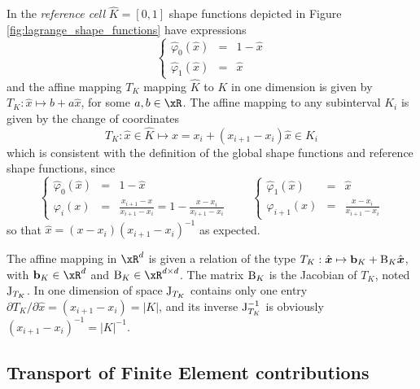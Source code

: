\medskip
In the \textit{reference cell} $\hat{K} = [0,1]$ shape functions depicted in Figure \ref{fig:lagrange_shape_functions} have expressions
\begin{equation*}
\left\lbrace
\begin{array}{lcl}
\hat\varphi_0(\hat x) &=& 1 - \hat x\\
\hat\varphi_1(\hat x) &=& \hat x
\end{array}
\right.
\end{equation*}
and the affine mapping $T_K$ mapping $\hat K$ to $K$ in one dimension is given by $T_K : \hat x \mapsto b + a \hat x$, for some $a, b\in\xR$.
The affine mapping to any subinterval $K_i$ is given by the change of coordinates
\begin{equation*}\label{eq:affine_mapping_1d}
T_K: \hat x \in \hat K \mapsto x = x_i + (x_{i+1} - x_{i}) \hat x \in K_i
\end{equation*}
which is consistent with the definition of the global shape functions and reference shape functions, since
\begin{equation*}
\left\lbrace
\begin{array}{lcl}
\hat\varphi_0(\hat x) &=& 1 - \hat x\\
\varphi_{i}(x)        &=& \displaystyle\frac{x_{i+1} - x}{x_{i+1} - x_{i}} = 1 - \frac{x - x_{i}}{x_{i+1} - x_{i}}
\end{array}
\right.
\qquad
\left\lbrace
\begin{array}{lcl}
\hat\varphi_1(\hat x) &=& \hat x\\
\varphi_{i+1}(x)      &=& \displaystyle\frac{x - x_{i}}{x_{i+1} - x_{i}}
\end{array}
\right.
\end{equation*}
so that $\hat x = (x - x_{i})(x_{i+1} - x_{i})^{-1}$ as expected.

\begin{rmrk} The affine mapping in $\xR^d$ is given a relation of the type $T_K : \hat {{{\boldsymbol x}}} \mapsto \mathbf b_K + {\mathrm B}_K \hat {{{\boldsymbol x}}}$, with $\vecb_K\in\xR^d$ and $\matB_K\in\xR^{d\times d}$.
The matrix ${\mathrm B}_K$ is the Jacobian of $T_K$, noted ${\mathrm J}_{T_K}$. In one dimension of space ${\mathrm J}_{T_K}$ contains only one entry $\partial T_K / \partial \hat{x} = (x_{i+1} - x_{i}) = |K|$, and its inverse ${\mathrm J}^{-1}_{T_K}$ is obviously $(x_{i+1} - x_{i})^{-1} = |K|^{-1}$.
\end{rmrk}

\subsection{Transport of Finite Element contributions}


